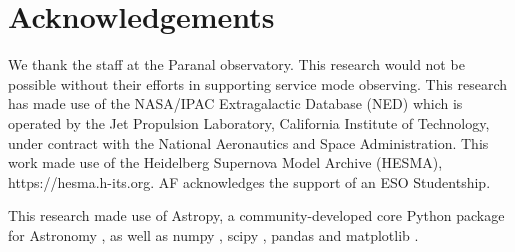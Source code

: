 \documentclass[fleqn,usenatbib]{mnras}
\begin{document}
\section*{Acknowledgements}
We thank the staff at the Paranal observatory. This research would not be possible without their efforts in supporting service mode observing. This research has made use of the NASA/IPAC Extragalactic Database (NED) which is operated by the Jet Propulsion Laboratory, California Institute of Technology, under contract with the National Aeronautics and Space Administration. This work made use of the Heidelberg Supernova Model Archive (HESMA), https://hesma.h-its.org. AF acknowledges the support of an ESO Studentship. 

This research made use of Astropy, a community-developed core Python package for Astronomy \citep{2013A&A...558A..33A, 2018AJ....156..123A}, as well as numpy \citep{Walt:2011:NAS:1957373.1957466}, scipy \citep{scipy}, pandas \citep{mckinney-proc-scipy-2010} and matplotlib \citep{doi:10.1109/MCSE.2007.55}.









\appendix
\end{document}
